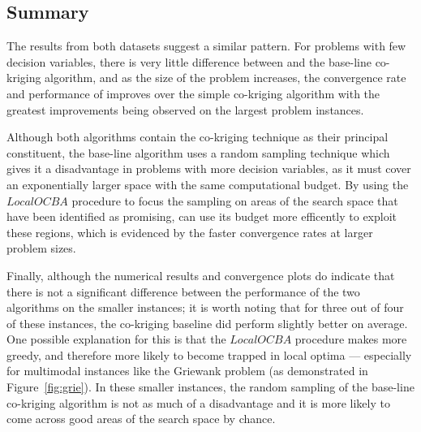 \subsection*{Summary}
The results from both datasets suggest a similar pattern. For problems with few decision variables, there is very little difference between \AlgName{} and the base-line co-kriging algorithm, and as the size of the problem increases, the convergence rate and performance of \AlgName{} improves over the simple co-kriging algorithm with the greatest improvements being observed on the largest problem instances.

Although both algorithms contain the co-kriging technique as their principal constituent, the base-line algorithm uses a random sampling technique which gives it a disadvantage in problems with more decision variables, as it must cover an exponentially larger space with the same computational budget. By using the $LocalOCBA$ procedure to focus the sampling on areas of the search space that have been identified as promising, \AlgName{} can use its budget more efficently to exploit these regions, which is evidenced by the faster convergence rates at larger problem sizes.

Finally, although the numerical results and convergence plots do indicate that there is not a significant difference between the performance of the two algorithms on the smaller instances; it is worth noting that for three out of four of these instances, the co-kriging baseline did perform slightly better on average. One possible explanation for this is that the $LocalOCBA$ procedure makes \AlgName{} more greedy, and therefore more likely to become trapped in local optima --- especially for multimodal instances like the Griewank problem (as demonstrated in Figure~\ref{fig:grie}). In these smaller instances, the random sampling of the base-line co-kriging algorithm is not as much of a disadvantage and it is more likely to come across good areas of the search space by chance.